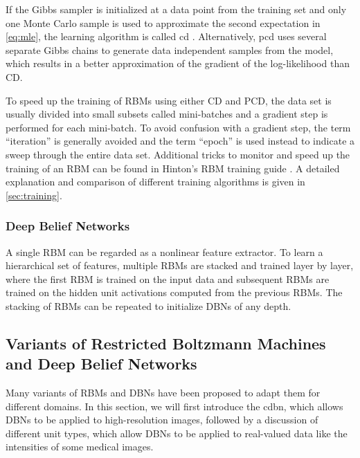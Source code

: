 If the Gibbs sampler is initialized at a data point from the training set and
only one Monte Carlo sample is used to approximate the second expectation in
\ref{eq:mle}, the learning algorithm is called \gls{cd} \citep{hinton2002}.
Alternatively, \gls{pcd} \citep{tieleman2008} uses several separate Gibbs chains
to generate data independent samples from the model, which results in a better
approximation of the gradient of the log-likelihood than CD.

To speed up the training of RBMs using either CD and PCD, the data set is
usually divided into small subsets called mini-batches and a gradient step is
performed for each mini-batch. To avoid confusion with a gradient step, the term
``iteration'' is generally avoided and the term ``epoch'' is used instead to
indicate a sweep through the entire data set. Additional tricks to monitor and
speed up the training of an RBM can be found in Hinton's RBM training guide
\citep{hinton2010a}. A detailed explanation and comparison of different training
algorithms is given in \ref{sec:training}.

\subsubsection[Deep belief networks]{Deep Belief Networks}

%

A single RBM can be regarded as a nonlinear feature extractor. To learn a
hierarchical set of features, multiple RBMs are stacked and trained layer by
layer, where the first RBM is trained on the input data and subsequent RBMs are
trained on the hidden unit activations computed from the previous RBMs. The
stacking of RBMs can be repeated to initialize DBNs of any depth.

\subsection[Variants of restricted Boltzmann machines and deep belief
networks]{Variants of Restricted Boltzmann Machines and Deep Belief
Networks}

Many variants of RBMs and DBNs have been proposed to adapt them for different
domains. In this section, we will first introduce the \gls{cdbn}, which allows
DBNs to be applied to high-resolution images, followed by a discussion of
different unit types, which allow DBNs to be applied to real-valued data like
the intensities of some medical images.

